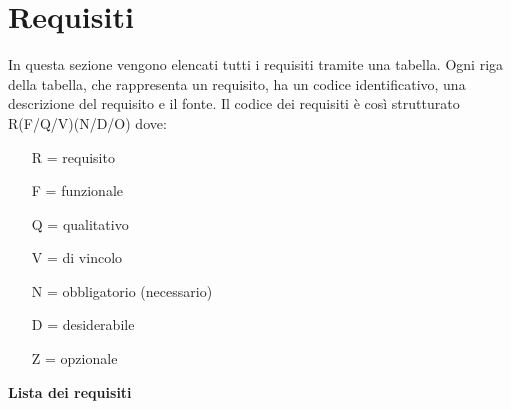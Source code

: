 \chapter{Requisiti}
In questa sezione vengono elencati tutti i requisiti tramite una tabella. Ogni riga della tabella, che rappresenta un requisito, ha un codice identificativo, una descrizione del requisito e il fonte.
Il codice dei requisiti è così strutturato R(F/Q/V)(N/D/O) dove:
\begin{enumerate}
	\item[R =] requisito
    \item[F =] funzionale
    \item[Q =] qualitativo
    \item[V =] di vincolo
    \item[N =] obbligatorio (necessario)
    \item[D =] desiderabile
    \item[Z =] opzionale
\end{enumerate}
\textbf{Lista dei requisiti}
